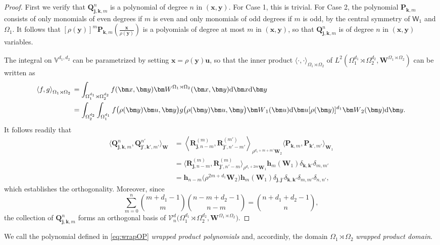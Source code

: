 \documentclass{amsart}
\theoremstyle{remark}
\def\la{{\langle}}
\def\ra{{\rangle}}
\def\d{\mathrm{d}}
\def\sW{{\mathsf W}}
\def\la{{\langle}}
\def\ra{{\rangle}}
\def\jb{{\bm j}}
\def\hb{{\bm h}}
\def\kb{{\bm k}}
\def\mb{{\bm m}}
\def\ub{{\bm u}}
\def\xb{{\bm x}}
\def\yb{{\bm y}}
\def\Pb{{\bm P}}
\def\Qb{{\bm Q}}
\def\Rb{{\bm R}}
\def\Wb{{\bm W}}
\def\CV{{\mathcal V}}
\def\VV{{\mathbb V}}
\def\bk{{\boldsymbol{\kappa}}}
\begin{document}
\begin{proof}
First we verify that $\Qb_{\jb, \kb, m}^n$ is a polynomial of degree $n$ in $(\xb, \yb)$. For Case 1, this is trivial. 
For Case 2, the polynomial $\Pb_{\kb,m}$ consists of only monomials of even degrees if $m$ is even
and only monomials of odd degrees if $m$ is odd, by the central symmetry of $\sW_1$ and $\Omega_1$. 
It follows that $[\rho(\yb)]^m \Pb_{\kb, m}(\frac{\xb}{\rho(\yb)})$ is a polyomials of degree at most $m$ in 
$(\xb,\yb)$, so that $\Qb_{\jb,\kb,m}^n$ is of degree $n$ in $(\xb,\yb)$ variables.  

The integral on $\VV^{d_1,d_2}$ can be parametrized by setting $\xb = \rho(\yb) \ub$, so that the inner 
product $\la \cdot,\cdot \ra_{\Omega_1\rtimes \Omega_2}$ of $L^2( \Omega_1^{d_1}  \rtimes \Omega_2^{d_2}, \Wb^{\Omega_1\rtimes \Omega_2})$ can be written as 
\begin{align} \label{eq:integra;=}
\la f, g \ra_{\Omega_1\rtimes \Omega_2}
   \, &=   \int_{ \Omega_1^{d_1}  \rtimes \Omega_2^{d_2}} f(\xb,\yb) \Wb^{\Omega_1\rtimes \Omega_2}(\xb, \yb) \d \xb \d \yb  \\
  & =  \int_{\Omega_2^{d_2}} \int_{\Omega_1^{d_1}} f\big(\rho(\yb) \ub, \yb\big)  g\big(\rho(\yb) \ub, \yb\big) \Wb_1(\ub) \d \ub 
  [\rho(\yb)]^{d_1} \Wb_2(\yb) \d \yb. \notag
\end{align}
It follows readily that 
\begin{align*}
  \la  \Qb_{\jb, \kb, m}^n,  \Qb_{\jb', \kb', m'}^{n'}\ra_{\Wb} & = 
   \left \langle \Rb_{\jb,n-m}^{(m)}, \Rb_{\jb',n'-m'}^{(m')} \right \rangle_{\rho^{d_1+m+m'} \Wb_2}  \la \Pb_{\kb,m}, \Pb_{\kb',m'}\ra_{\Wb_1}  \\
 & = \Big \langle  \Rb_{\jb,n-m}^{(m)}, \Rb_{\jb',n'-m}^{(m)} \Big \rangle_{\rho^{d_1+2m} \Wb_1} \hb_m(\Wb_1)
 \delta_{\kb, \kb'} \delta_{m,m'} \\
 & = \hb_{n-m}\big(\rho^{2m+d_1}\Wb_2\big) \hb_m(\Wb_1)
  \delta_{\jb, \jb'}\delta_{\kb, \kb'} \delta_{m,m'} \delta_{n,n'},
\end{align*}
which establishes the orthogonality. Moreover, since
$$
  \sum_{m=0}^n \binom{m + d_1 - 1}{m} \binom{n - m + d_2 - 1}{n - m} = \binom{n + d_1 + d_2 - 1}{n}, 
$$
the collection of $\bm Q_{\bm j, \bm k, m}^n$ forms an orthogonal basis of 
$\CV_n^d\big( \Omega_1^{d_1}\rtimes \Omega_2^{d_2}, \Wb^{\Omega_1\rtimes \Omega_2}\big)$. 
\end{proof}

We call the polynomial defined in \eqref{eq:wrapOP} {\it wrapped product polynomials} and, accordinly, the domain
$\Omega_1 \rtimes \Omega_2$ {\it wrapped product domain}.  
\end{document}
